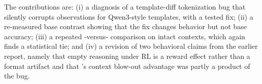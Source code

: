 The contributions are: (i) a diagnosis of a template-diff tokenization bug that silently
corrupts observations for Qwen3-style templates, with a tested fix; (ii) a re-measured base
contrast showing that the fix changes behavior but not base accuracy; (iii) a repeated
\foldgrpo{}-versus-\grpo{} comparison on intact contexts, which again finds a statistical tie;
and (iv) a revision of two behavioral claims from the earlier report, namely that empty
reasoning under RL is a reward effect rather than a format artifact and that \foldgrpo{}'s
context blow-out advantage was partly a product of the bug.
